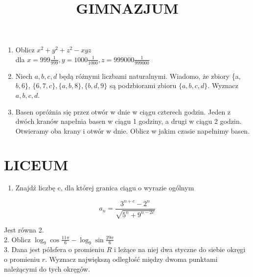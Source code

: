 \documentclass[10pt]{article}
\title{GIMNAZJUM }
\author{}
\date{}
\begin{document}
\maketitle
\begin{enumerate}
  \item Oblicz \(x^{2}+y^{2}+z^{2}-x y z\)\\
dla \(x=999 \frac{1}{999}, y=1000 \frac{1}{1000}, z=999000 \frac{1}{999000}\)
  \item Niech \(a, b, c, d\) będą różnymi liczbami naturalnymi. Wiadomo, że zbiory \{a, \(b, 6\}\), \(\{6,7, c\},\{a, b, 8\},\{b, d, 9\}\) są podzbiorami zbioru \(\{a, b, c, d\}\). Wyznacz \(a, b, c, d\).
  \item Basen opróżnia się przez otwór w dnie w ciągu czterech godzin. Jeden z dwóch kranów napełnia basen w ciągu 1 godziny, a drugi w ciągu 2 godzin. Otwieramy oba krany i otwór w dnie. Oblicz w jakim czasie napełnimy basen.
\end{enumerate}

\section*{LICEUM}
\begin{enumerate}
  \item Znajdź liczbę c, dla której granica ciągu o wyrazie ogólnym
\end{enumerate}

\[
a_{n}=\frac{3^{n+c}-2^{n}}{\sqrt{5^{n}+9^{n-2 c}}}
\]

Jest równa 2.\\
2. Oblicz \(\log _{9} \cos \frac{11 \pi}{6}-\log _{9} \sin \frac{29 \pi}{6}\)\\
3. Dana jest półsfera o promieniu \(R\) i leżące na niej dwa styczne do siebie okręgi o promieniu \(r\). Wyznacz największą odległość między dwoma punktami należącymi do tych okręgów.
\end{document}
